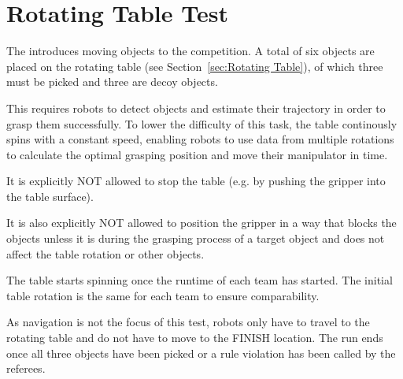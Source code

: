 \section{Rotating Table Test}
\label{sec:Rotating Table Test}

The  introduces moving objects to the competition.
A total of six objects are placed on the rotating table (see Section~\ref{sec:Rotating Table}), of which three must be picked and three are decoy objects.

This requires robots to detect objects and estimate their trajectory in order to grasp them successfully.
To lower the difficulty of this task, the table continously spins with a constant speed, enabling robots to use data from multiple rotations to calculate the optimal grasping position and move their manipulator in time.

It is explicitly NOT allowed to stop the table (e.g. by pushing the gripper into the table surface).

It is also explicitly NOT allowed to position the gripper in a way that blocks the objects 
unless it is during the grasping process of a target object and does not affect the table rotation or other objects.

The table starts spinning once the runtime of each team has started.
The initial table rotation is the same for each team to ensure comparability.  

As navigation is not the focus of this test, robots only have to travel to the rotating table and do not have to move to the FINISH location. The run ends once all three objects have been picked or a rule violation has been called by the referees.



